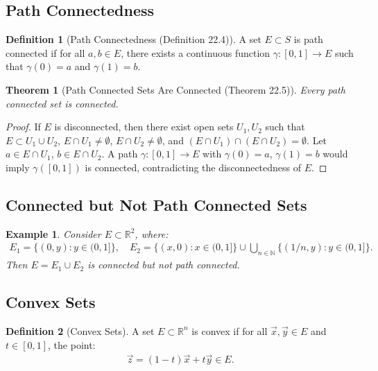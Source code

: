 \documentclass[9pt]{article}
\theoremstyle{definition}
\newtheorem{definition}{Definition}
\theoremstyle{plain}
\newtheorem{theorem}{Theorem}
\newtheorem{example}{Example}
\begin{document}
\subsection*{Path Connectedness}
\begin{definition}[Path Connectedness (Definition 22.4)]
A set $ E \subset S $ is path connected if for all $ a, b \in E $, there exists a continuous function $ \gamma : [0, 1] \to E $ such that $ \gamma(0) = a $ and $ \gamma(1) = b $.
\end{definition}

\begin{theorem}[Path Connected Sets Are Connected (Theorem 22.5)]
Every path connected set is connected.
\end{theorem}

\begin{proof}
If $ E $ is disconnected, then there exist open sets $ U_1, U_2 $ such that $ E \subset U_1 \cup U_2 $, $ E \cap U_1 \neq \emptyset $, $ E \cap U_2 \neq \emptyset $, and $ (E \cap U_1) \cap (E \cap U_2) = \emptyset $. Let $ a \in E \cap U_1 $, $ b \in E \cap U_2 $. A path $ \gamma : [0, 1] \to E $ with $ \gamma(0) = a $, $ \gamma(1) = b $ would imply $ \gamma([0, 1]) $ is connected, contradicting the disconnectedness of $ E $.
\end{proof}

\subsection*{Connected but Not Path Connected Sets}
\begin{example}
Consider $ E \subset \mathbb{R}^2 $, where:
\begin{align}
E_1 = \{(0, y) : y \in (0, 1]\}, \quad
E_2 = \{(x, 0) : x \in (0, 1]\} \cup \bigcup_{n \in \mathbb{N}} \{(1/n, y) : y \in (0, 1]\}.
\end{align}
Then $ E = E_1 \cup E_2 $ is connected but not path connected.
\end{example}

\subsection*{Convex Sets}
\begin{definition}[Convex Sets]
A set $ E \subset \mathbb{R}^n $ is convex if for all $ \vec{x}, \vec{y} \in E $ and $ t \in [0, 1] $, the point:
\begin{align}
\vec{z} = (1-t)\vec{x} + t\vec{y} \in E.
\end{align}
\end{definition}
\end{document}

